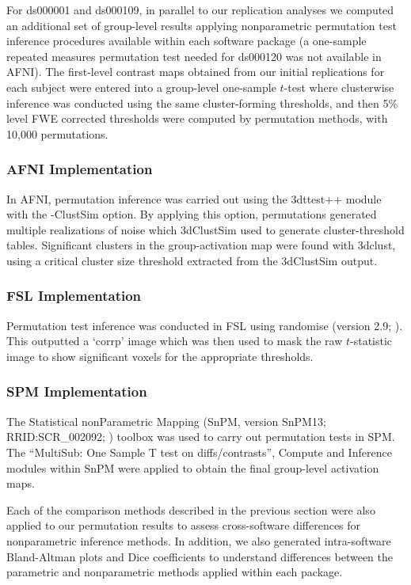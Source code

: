 For ds000001 and ds000109, in parallel to our replication analyses we computed an additional set of group-level results applying nonparametric permutation test inference procedures available within each software package (a one-sample repeated measures permutation test needed for ds000120 was not available in AFNI). The first-level contrast maps obtained from our initial replications for each subject were entered into a group-level one-sample $t$-test where clusterwise inference was conducted using the same cluster-forming thresholds, and then 5\% level FWE corrected thresholds were computed by permutation methods, with 10,000 permutations.

\subsubsection{AFNI Implementation}
In AFNI, permutation inference was carried out using the 3dttest++ module with the -ClustSim option. By applying this option, permutations generated multiple realizations of noise which 3dClustSim used to generate cluster-threshold tables. Significant clusters in the group-activation map were found with 3dclust, using a critical cluster size threshold extracted from the 3dClustSim output. 

\subsubsection{FSL Implementation}
Permutation test inference was conducted in FSL using randomise (version 2.9; \citep{Winkler2016-mw}). This outputted a `corrp' image which was then used to mask the raw $t$-statistic image to show significant voxels for the appropriate thresholds. 

\subsubsection{SPM Implementation}
The Statistical nonParametric Mapping (SnPM, version SnPM13; RRID:SCR\_002092; \citep{Nichols2002-kf}) toolbox was used to carry out permutation tests in SPM. The ``MultiSub: One Sample T test on diffs/contrasts'', Compute and Inference modules within SnPM were applied to obtain the final group-level activation maps.

Each of the comparison methods described in the previous section were also applied to our permutation results to assess cross-software differences for nonparametric inference methods. In addition, we also generated intra-software Bland-Altman plots and Dice coefficients to understand differences between the parametric and nonparametric methods applied within each package. 

